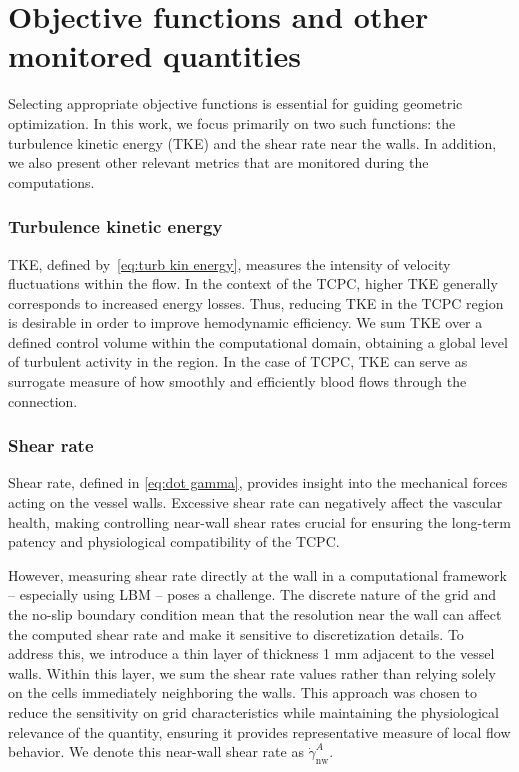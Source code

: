 \section{Objective functions and other monitored quantities}\label{objective funcs meaning}
Selecting appropriate objective functions is essential for guiding geometric optimization. In this work, we focus primarily on two such functions: the turbulence kinetic energy (TKE) and the shear rate near the walls. In addition, we also present other relevant metrics that are monitored during the computations.

\subsubsection*{Turbulence kinetic energy}
TKE, defined by~\eqref{eq:turb kin energy}, measures the intensity of velocity fluctuations within the flow. In the context of the TCPC, higher TKE generally corresponds to increased energy losses. Thus, reducing TKE in the TCPC region is desirable in order to improve hemodynamic efficiency. We sum TKE over a defined control volume within the computational domain, obtaining a global level of turbulent activity in the region. In the case of TCPC, TKE can serve as surrogate measure of how smoothly and efficiently blood flows through the connection. 

\subsubsection*{Shear rate}
Shear rate, defined in \eqref{eq:dot gamma}, provides insight into the mechanical forces acting on the vessel walls. Excessive shear rate can negatively affect the vascular health, making controlling near-wall shear rates crucial for ensuring the long-term patency and physiological compatibility of the TCPC.

However, measuring shear rate directly at the wall in a computational framework -- especially using LBM -- poses a challenge. The discrete nature of the grid and the no-slip boundary condition mean that the resolution near the wall can affect the computed shear rate and make it sensitive to discretization details. To address this, we introduce a thin layer of thickness 1 mm adjacent to the vessel walls. Within this layer, we sum the shear rate values rather than relying solely on the cells immediately neighboring the walls. This approach was chosen to reduce the sensitivity on grid characteristics while maintaining the physiological relevance of the quantity, ensuring it provides representative measure of local flow behavior. We denote this near-wall shear rate as $\dot{\gamma}^{A}_{\mathrm{nw}}$.

